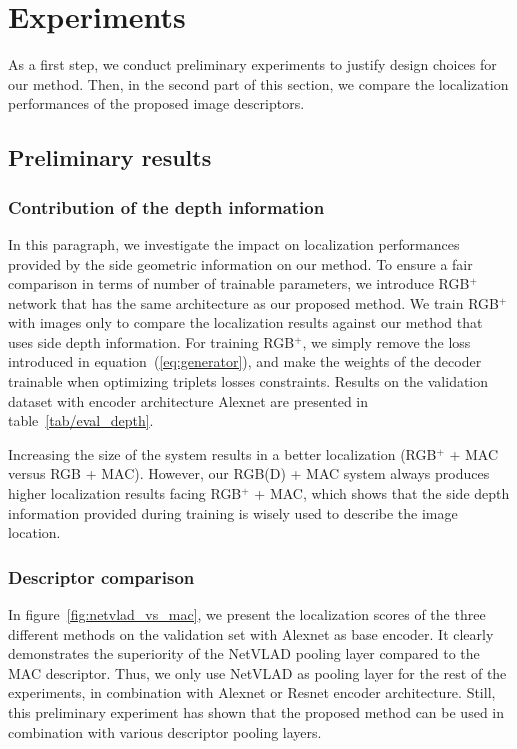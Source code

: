 \section{Experiments}
\label{sec:experiments}

As a first step, we conduct preliminary experiments to justify design choices for our method. Then, in the second part of this section, we compare the localization performances of the proposed image descriptors.



\subsection{Preliminary results}


\subsubsection{Contribution of the depth information} 
In this paragraph, we investigate the impact on localization performances provided by the side geometric information on our method. To ensure a fair comparison in terms of number of trainable parameters, we introduce RGB$^+$ network that has the same architecture as our proposed method. We train RGB$^+$ with images only to compare the localization results against our method that uses side depth information. For training RGB$^+$, we simply remove the loss introduced in equation~(\ref{eq:generator}), and make the weights of the decoder trainable when optimizing triplets losses constraints. Results on the validation dataset with encoder architecture Alexnet are presented in table~\ref{tab/eval_depth}.

Increasing the size of the system results in a better localization (RGB$^{+}$ + MAC versus RGB + MAC). However, our RGB(D) + MAC system always produces higher localization results facing RGB$^{+}$ + MAC, which shows that the side depth information provided during training is wisely used to describe the image location.

\subsubsection{Descriptor comparison} 
In figure~\ref{fig:netvlad_vs_mac}, we present the localization scores of the three different methods on the validation set with Alexnet as base encoder. It clearly demonstrates the superiority of the NetVLAD pooling layer compared to the MAC descriptor. Thus, we only use NetVLAD as pooling layer for the rest of the experiments, in combination with Alexnet or Resnet encoder architecture. Still, this preliminary experiment has shown that the proposed method can be used in combination with various descriptor pooling layers.

